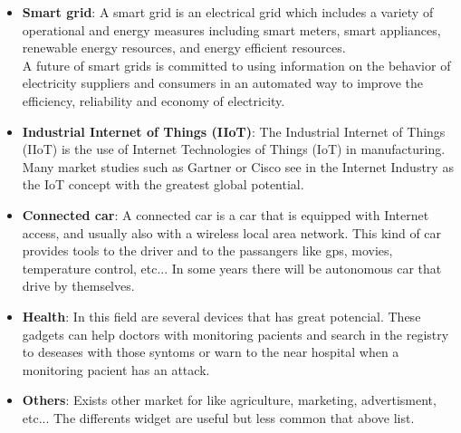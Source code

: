 \begin{itemize}
	\item \textbf{Smart grid}: A smart grid is an electrical grid which includes a variety of operational and energy measures including smart meters, smart appliances, renewable energy resources, and energy efficient resources.\\
	A future of smart grids is committed to using information on the behavior of electricity suppliers and consumers in an automated way to improve the efficiency, reliability and economy of electricity.

	\item \textbf{Industrial Internet of Things (IIoT)}: The Industrial Internet of Things (IIoT) is the use of Internet Technologies of Things (IoT) in manufacturing.\\ Many market studies such as Gartner or Cisco see in the Internet Industry as the IoT concept with the greatest global potential.

	\item \textbf{Connected car}: A connected car is a car that is equipped with Internet access, and usually also with a wireless local area network. This kind of car provides tools to the driver and to the passangers like gps, movies, temperature control, etc... In some years there will be autonomous car that drive by themselves.

	\item \textbf{Health}: In this field are several devices that has great potencial. These gadgets can help doctors with monitoring pacients and search in the registry to deseases with those syntoms or warn to the near hospital when a monitoring pacient has an attack.

	\item \textbf{Others}: Exists other market for \IoT like agriculture, marketing, advertisment, etc... The differents \IoT widget are useful but less common that above list.
\end{itemize}